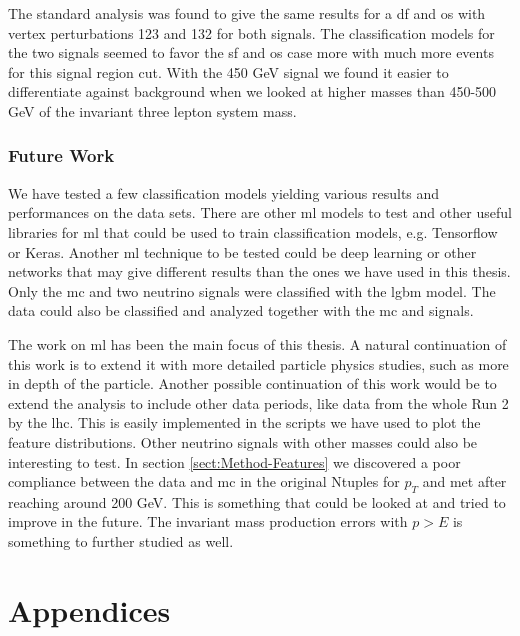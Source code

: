 \documentclass[a4paper, american, 12pt]{report}
\begin{document}
	The standard analysis was found to give the same results for a \acrshort{df} and \acrshort{os} with vertex perturbations 123 and 132 for both signals. The classification models for the two signals seemed to favor the \acrshort{sf} and \acrshort{os} case more with much more events for this signal region cut. With the 450 GeV signal we found it easier to differentiate against background when we looked at higher masses than 450-500 GeV of the invariant three lepton system mass.

	
	\section{Future Work}
	\label{sect:Conclusion-Future}
	We have tested a few classification models yielding various results and performances on the data sets. There are other \acrshort{ml} models to test and other useful libraries for \acrshort{ml} that could be used to train classification models, e.g. Tensorflow or Keras. Another \acrshort{ml} technique to be tested could be deep learning or other networks that may give different results than the ones we have used in this thesis. Only the \acrshort{mc} and two neutrino signals were classified with the \acrshort{lgbm} model. The data could also be classified and analyzed together with the \acrshort{mc} and signals.
	
	The work on \acrshort{ml} has been the main focus of this thesis. A natural continuation of this work is to extend it with more detailed particle physics studies, such as more in depth of the particle. Another possible continuation of this work would be to extend the analysis to include other data periods, like data from the whole Run 2 by the \acrshort{lhc}. This is easily implemented in the scripts we have used to plot the feature distributions. Other neutrino signals with other masses could also be interesting to test. In section \ref{sect:Method-Features} we discovered a poor compliance between the data and \acrshort{mc} in the original Ntuples for $p_T$ and \acrshort{met} after reaching around 200 GeV. This is something that could be looked at and tried to improve in the future. The invariant mass production errors with $p>E$ is something to further studied as well.

	

	\appendix
	\part{Appendices}
	\label{part:Appendix}
	
\end{document}
